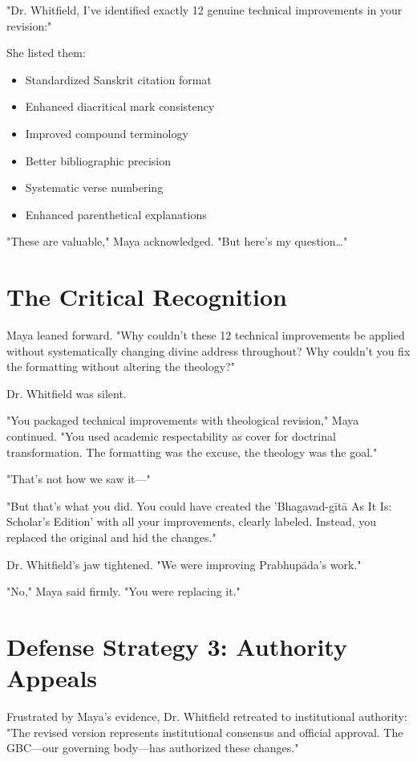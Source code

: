 \documentclass[11pt,twoside]{book}
\begin{document}
"Dr. Whitfield, I've identified exactly 12 genuine technical improvements in your revision:"

She listed them:
\begin{itemize}
\item Standardized Sanskrit citation format
\item Enhanced diacritical mark consistency
\item Improved compound terminology
\item Better bibliographic precision
\item Systematic verse numbering
\item Enhanced parenthetical explanations
\end{itemize}

"These are valuable," Maya acknowledged. "But here's my question\ldots{}"
\section*{The Critical Recognition}
\label{sec:org922e1c0}

Maya leaned forward. "Why couldn't these 12 technical improvements be applied without systematically changing divine address throughout? Why couldn't you fix the formatting without altering the theology?"

Dr. Whitfield was silent.

"You packaged technical improvements with theological revision," Maya continued. "You used academic respectability as cover for doctrinal transformation. The formatting was the excuse, the theology was the goal."

"That's not how we saw it—"

"But that's what you did. You could have created the 'Bhagavad-gītā As It Is: Scholar's Edition' with all your improvements, clearly labeled. Instead, you replaced the original and hid the changes."

Dr. Whitfield's jaw tightened. "We were improving Prabhupāda's work."

"No," Maya said firmly. "You were replacing it."
\section*{Defense Strategy 3: Authority Appeals}
\label{sec:orga9af466}

Frustrated by Maya's evidence, Dr. Whitfield retreated to institutional authority: "The revised version represents institutional consensus and official approval. The GBC—our governing body—has authorized these changes."
\end{document}
